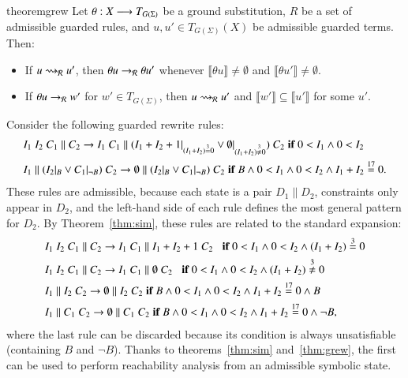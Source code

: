 \begin{restatable}{theorem}{grew}
\label{thm:grew}
Let $\theta : X \longrightarrow T_{G(\Sigma)}$ be a ground substitution, 
$R$ be a set of admissible guarded rules, and 
$u, u' \in  T_{G(\Sigma)}(X)$ be admissible guarded terms. Then:
\begin{itemize}
	\item If $u \rightsquigarrow_{\mathcal{R}} u'$, then $\theta u \to_{\mathcal{R}} \theta u'$
    whenever $\llbracket \theta u \rrbracket \neq \emptyset$ and
    $\llbracket \theta u' \rrbracket \neq \emptyset$.
	\item If $\theta u \to_{\mathcal{R}} w'$ for $w' \in T_{G(\Sigma)}$, then $u
    \rightsquigarrow_{\mathcal{R}} u'$ and $\llbracket w' \rrbracket \subseteq \llbracket
    u' \rrbracket$ for some $u'$.
\end{itemize}
\end{restatable}

\begin{example}
Consider the following guarded rewrite rules:
%
\small
\begin{align*}
  &I_1\;I_2\;C_1 \parallel C_2 \rightarrow I_1 \; C_1 \parallel (I_1 + I_2 + 1 |_{(I_1 + I_2) \stackrel{3}{=} 0} \vee \emptyset |_{(I_1 + I_2) \stackrel{3}{\not =} 0} )\;C_2\;\textnormal{\bf if}\; {0 < I_1 \land 0< I_2} 
\\
  &I_1 \parallel (I_2 |_B \vee C_1 |_{\neg B}) \;C_2 \rightarrow \emptyset \parallel (I_2 |_B \vee C_1 |_{\neg B}) \;C_2\;\textnormal{\bf if}\; {B \land 0 < I_1 \land 0< I_2 \land I_1 + I_2 \stackrel{17}{=} 0}.
\end{align*}
\normalsize
%
These rules are admissible, because each state is a pair $D_1
\parallel D_2$, constraints only appear in $D_2$, and the left-hand
side of each rule defines the most general pattern for $D_2$.  By
Theorem~\ref{thm:sim}, these rules are related to the standard
expansion:
%
\small
\begin{align*}
  &I_1\;I_2\;C_1 \parallel C_2 \rightarrow I_1 \; C_1 \parallel I_1 + I_2 + 1\;C_2\;\;\;\textnormal{\bf if}\; {0 < I_1 \land 0< I_2 \land (I_1 + I_2) \stackrel{3}{=} 0} 
\\
  &I_1\;I_2\;C_1 \parallel C_2 \rightarrow I_1 \; C_1 \parallel \emptyset \;C_2\;\;\;\textnormal{\bf if}\; {0 < I_1 \land 0< I_2 \land (I_1 + I_2) \stackrel{3}{\not =} 0} 
\\
  &I_1 \parallel I_2 \;C_2 \rightarrow \emptyset \parallel I_2  \;C_2\;\textnormal{\bf if}\; {B \land 0 < I_1 \land 0< I_2 \land I_1 + I_2 \stackrel{17}{=} 0 \land B} 
\\
  &I_1 \parallel C_1 \;C_2 \rightarrow \emptyset \parallel C_1  \;C_2\;\textnormal{\bf if}\; {B \land 0 < I_1 \land 0< I_2 \land I_1 + I_2 \stackrel{17}{=} 0 \land \neg B},
\end{align*}
\normalsize
%
where the last rule can be discarded because its condition is always
unsatisfiable (containing $B$ and $\neg B$).  Thanks to
theorems~\ref{thm:sim} and~\ref{thm:grew}, the first can be used to
perform reachability analysis from an admissible symbolic state.
\end{example}

